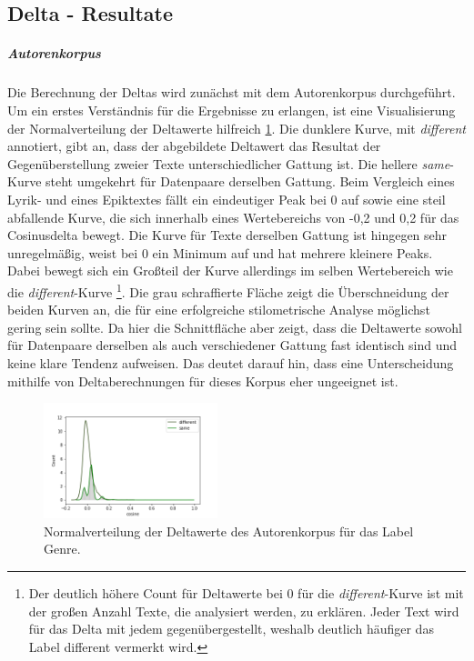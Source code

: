 \documentclass[a4paper,10p]{article}
\begin{document}
\subsection{Delta - Resultate}
\subparagraph{Autorenkorpus} \quad \par 
Die Berechnung der Deltas wird zunächst mit dem Autorenkorpus durchgeführt. Um ein erstes Verständnis für die Ergebnisse zu erlangen, ist eine Visualisierung der Normalverteilung der Deltawerte hilfreich \ref{fig:normalverteilung_genre}. Die dunklere Kurve, mit \textit{different} annotiert, gibt an, dass der abgebildete Deltawert das Resultat der Gegenüberstellung zweier Texte unterschiedlicher Gattung ist. Die hellere \textit{same}-Kurve steht umgekehrt für Datenpaare derselben Gattung. Beim Vergleich eines Lyrik- und eines Epiktextes fällt ein eindeutiger Peak bei 0 auf sowie eine steil abfallende Kurve, die sich innerhalb eines Wertebereichs von -0,2 und 0,2 für das Cosinusdelta bewegt. Die Kurve für Texte derselben Gattung ist hingegen sehr unregelmäßig, weist bei 0 ein Minimum auf und hat mehrere kleinere Peaks. Dabei bewegt sich ein Großteil der Kurve allerdings im selben Wertebereich wie die \textit{different}-Kurve \footnote{Der deutlich höhere Count für Deltawerte bei 0 für die \textit{different}-Kurve ist mit der großen Anzahl Texte, die analysiert werden, zu erklären. Jeder Text wird für das Delta mit jedem gegenübergestellt, weshalb deutlich häufiger das Label \glqq different \grqq vermerkt wird.}. Die grau schraffierte Fläche zeigt die Überschneidung der beiden Kurven an, die für eine erfolgreiche stilometrische Analyse möglichst gering sein sollte. Da hier die Schnittfläche aber zeigt, dass die Deltawerte sowohl für Datenpaare derselben als auch verschiedener Gattung fast identisch sind und keine klare Tendenz aufweisen. Das deutet darauf hin, dass eine Unterscheidung mithilfe von Deltaberechnungen für dieses Korpus eher ungeeignet ist. \par 

\begin{figure}
	\includegraphics[width=0.45\textwidth]{autoren_delta_samedif_genre.png}
	\caption{Normalverteilung der Deltawerte des Autorenkorpus für das Label Genre.}
	\label{fig:normalverteilung_genre}
	\end{figure}
		
\end{document}
